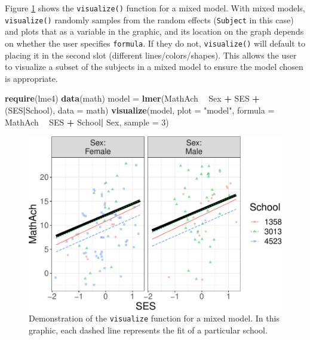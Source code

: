 \documentclass[
  doc]{apa6}
\newenvironment{Shaded}{\begin{snugshade}}{\end{snugshade}}
\newcommand{\DataTypeTok}[1]{\textcolor[rgb]{0.13,0.29,0.53}{#1}}
\newcommand{\DecValTok}[1]{\textcolor[rgb]{0.00,0.00,0.81}{#1}}
\newcommand{\KeywordTok}[1]{\textcolor[rgb]{0.13,0.29,0.53}{\textbf{#1}}}
\newcommand{\NormalTok}[1]{#1}
\newcommand{\OperatorTok}[1]{\textcolor[rgb]{0.81,0.36,0.00}{\textbf{#1}}}
\newcommand{\StringTok}[1]{\textcolor[rgb]{0.31,0.60,0.02}{#1}}
\begin{document}
Figure \ref{fig:mixed} shows the \texttt{visualize()} function for a mixed model. With mixed models, \texttt{visualize()} randomly samples from the random effects (\texttt{Subject} in this case) and plots that as a variable in the graphic, and its location on the graph depends on whether the user specifies \texttt{formula}. If they do not, \texttt{visualize()} will default to placing it in the second slot (different lines/colors/shapes). This allows the user to visualize a subset of the subjects in a mixed model to ensure the model chosen is appropriate.

\begin{Shaded}
\begin{Highlighting}[]
\KeywordTok{require}\NormalTok{(lme4)}
\KeywordTok{data}\NormalTok{(math)}
\NormalTok{model =}\StringTok{ }\KeywordTok{lmer}\NormalTok{(MathAch }\OperatorTok{~}\StringTok{ }\NormalTok{Sex }\OperatorTok{+}\StringTok{ }\NormalTok{SES }\OperatorTok{+}\StringTok{ }\NormalTok{(SES}\OperatorTok{|}\NormalTok{School), }\DataTypeTok{data =}\NormalTok{ math)}
\KeywordTok{visualize}\NormalTok{(model, }
  \DataTypeTok{plot =} \StringTok{"model"}\NormalTok{,}
  \DataTypeTok{formula =}\NormalTok{ MathAch }\OperatorTok{~}\StringTok{  }\NormalTok{SES }\OperatorTok{+}\StringTok{ }\NormalTok{School}\OperatorTok{|}\StringTok{ }\NormalTok{Sex, }
  \DataTypeTok{sample =} \DecValTok{3}\NormalTok{)}
\end{Highlighting}
\end{Shaded}

\begin{figure}
\centering
\includegraphics{flexplot_psychmeth_files/figure-latex/mixed-1.pdf}
\caption{\label{fig:mixed}Demonstration of the \texttt{visualize} function for a mixed model. In this graphic, each dashed line represents the fit of a particular school. \label{fig:mixed}}
\end{figure}
\end{document}
